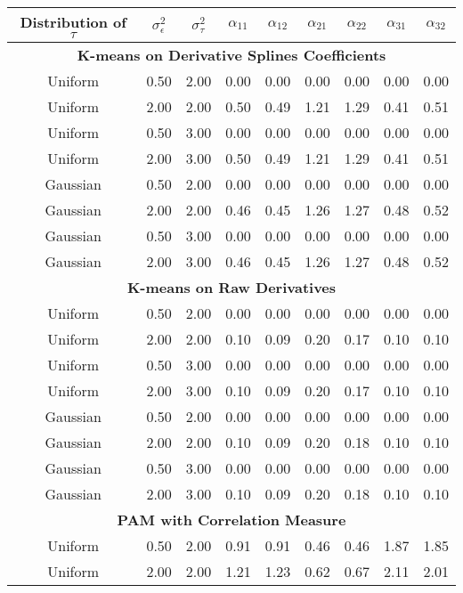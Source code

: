 \documentclass[12pt]{article}
\begin{document}
\begin{table}[ht]
\begin{center}
\begin{tabular}{ccc|cccccc}
  \hline Distribution of $\tau$&$\sigma_{\epsilon}^2$&$\sigma_{\tau}^2$&$\alpha_{11}$&$\alpha_{12}$&$\alpha_{21}$&$\alpha_{22}$&$\alpha_{31}$&$\alpha_{32}$\\ \hline\multicolumn{9}{c}{\textbf{K-means on Derivative Splines Coefficients}}\\ Uniform & 0.50 & 2.00 & 0.00 & 0.00 & 0.00 & 0.00 & 0.00 & 0.00 \\ 
  Uniform & 2.00 & 2.00 & 0.50 & 0.49 & 1.21 & 1.29 & 0.41 & 0.51 \\ 
  Uniform & 0.50 & 3.00 & 0.00 & 0.00 & 0.00 & 0.00 & 0.00 & 0.00 \\ 
  Uniform & 2.00 & 3.00 & 0.50 & 0.49 & 1.21 & 1.29 & 0.41 & 0.51 \\ 
  Gaussian & 0.50 & 2.00 & 0.00 & 0.00 & 0.00 & 0.00 & 0.00 & 0.00 \\ 
  Gaussian & 2.00 & 2.00 & 0.46 & 0.45 & 1.26 & 1.27 & 0.48 & 0.52 \\ 
  Gaussian & 0.50 & 3.00 & 0.00 & 0.00 & 0.00 & 0.00 & 0.00 & 0.00 \\ 
  Gaussian & 2.00 & 3.00 & 0.46 & 0.45 & 1.26 & 1.27 & 0.48 & 0.52 \\ 
   \multicolumn{9}{c}{\textbf{K-means on Raw Derivatives}}\\Uniform & 0.50 & 2.00 & 0.00 & 0.00 & 0.00 & 0.00 & 0.00 & 0.00 \\ 
  Uniform & 2.00 & 2.00 & 0.10 & 0.09 & 0.20 & 0.17 & 0.10 & 0.10 \\ 
  Uniform & 0.50 & 3.00 & 0.00 & 0.00 & 0.00 & 0.00 & 0.00 & 0.00 \\ 
  Uniform & 2.00 & 3.00 & 0.10 & 0.09 & 0.20 & 0.17 & 0.10 & 0.10 \\ 
  Gaussian & 0.50 & 2.00 & 0.00 & 0.00 & 0.00 & 0.00 & 0.00 & 0.00 \\ 
  Gaussian & 2.00 & 2.00 & 0.10 & 0.09 & 0.20 & 0.18 & 0.10 & 0.10 \\ 
  Gaussian & 0.50 & 3.00 & 0.00 & 0.00 & 0.00 & 0.00 & 0.00 & 0.00 \\ 
  Gaussian & 2.00 & 3.00 & 0.10 & 0.09 & 0.20 & 0.18 & 0.10 & 0.10 \\ 
   \multicolumn{9}{c}{\textbf{PAM with Correlation Measure}}\\Uniform & 0.50 & 2.00 & 0.91 & 0.91 & 0.46 & 0.46 & 1.87 & 1.85 \\ 
  Uniform & 2.00 & 2.00 & 1.21 & 1.23 & 0.62 & 0.67 & 2.11 & 2.01 \\ 

\end{tabular}
\end{center}
\end{table}
\end{document}
